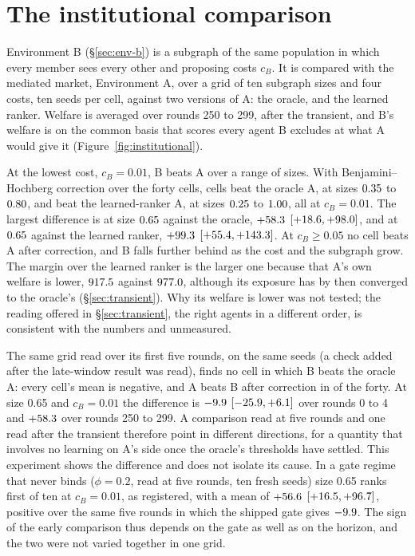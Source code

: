 
\section{The institutional comparison}
\label{sec:institutional}

Environment B (\S\ref{sec:env-b}) is a subgraph of the same population in which
every member sees every other and proposing costs $c_B$. It is compared with the
mediated market, Environment A, over a grid of ten subgraph sizes and four costs,
ten seeds per cell, against two versions of A: the oracle, and the learned ranker.
Welfare is averaged over rounds 250 to 299, after the transient, and B's welfare
is on the common basis that scores every agent B excludes at what A would give it
(Figure~\ref{fig:institutional}).

At the lowest cost, $c_B = 0.01$, B beats A over a range of sizes. With
Benjamini--Hochberg correction over the forty cells, \nBeatsOracle{} cells beat the
oracle A, at sizes $0.35$ to $0.80$, and \nBeatsNcf{} beat the
learned-ranker A, at sizes $0.25$ to $1.00$, all at $c_B = 0.01$.
The largest difference is at size $0.65$ against the oracle,
$+58.3$ $[+18.6, +98.0]$, and at $0.65$ against the
learned ranker, $+99.3$ $[+55.4, +143.3]$. At $c_B \ge 0.05$ no cell
beats A after correction, and B falls further behind as the cost and the subgraph
grow.
The margin over the learned ranker is the larger one because that A's own welfare
is lower, $917.5$ against $977.0$, although its exposure has by
then converged to the oracle's (\S\ref{sec:transient}). Why its welfare is lower
was not tested; the reading offered in \S\ref{sec:transient}, the right agents in a
different order, is consistent with the numbers and unmeasured.

The same grid read over its first five rounds, on the same seeds (a check added
after the late-window result was read), finds no
cell in which B beats the oracle A: every cell's mean is negative, and A beats B
after correction in \nABeatsFive{} of the forty. At size 0.65 and $c_B = 0.01$ the
difference is $-9.9$ $[-25.9, +6.1]$ over rounds 0 to 4 and
$+58.3$ over rounds 250 to 299. A comparison read at five rounds and one read
after the transient therefore point in different directions, for a quantity that
involves no learning on A's side once the oracle's thresholds have settled. This
experiment shows the difference and does not isolate its cause. In a gate regime
that never binds ($\phi = 0.2$, read at five rounds, ten fresh seeds) size 0.65
ranks first of ten at $c_B = 0.01$, as registered, with a mean of
$+56.6$ $[+16.5, +96.7]$, positive over the same five rounds in
which the shipped gate gives $-9.9$. The sign of the early comparison thus
depends on the gate as well as on the horizon, and the two were not varied
together in one grid.

